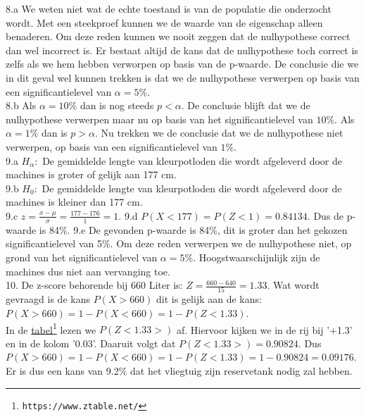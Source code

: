 8.a We weten niet wat de echte toestand is van de populatie die onderzocht wordt. Met een steekproef kunnen we de waarde van de eigenschap alleen benaderen. Om deze reden kunnen we nooit zeggen dat de nulhypothese correct dan wel incorrect is. Er bestaat altijd de kans dat de nulhypothese toch correct is zelfs als we hem hebben verworpen op basis van de p-waarde. De conclusie die we in dit geval wel kunnen trekken is dat we de nulhypothese verwerpen op basis van een significantielevel van $\alpha=5\%$.\\
8.b Als $\alpha=10\%$ dan is nog steeds $p<\alpha$. De conclusie blijft dat we de nulhypothese verwerpen maar nu op basis van het significantielevel van $10\%$. Als $\alpha=1\%$ dan is $p>\alpha$. Nu trekken we de conclusie dat we de nulhypothese niet verwerpen, op basis van een significantielevel van $1\%$.\\


9.a $H_{\alpha}:$ De gemiddelde lengte van kleurpotloden die wordt afgeleverd door de machines is groter of gelijk aan 177 cm.\\
9.b $H_{0}:$ De gemiddelde lengte van kleurpotloden die wordt afgeleverd door de machines is kleiner dan 177 cm.\\
9.c $z=\frac{x-\mu}{\sigma} = \frac{177-176}{1} = 1$.
9.d $P(X< 177) = P(Z< 1) = 0.84134$. Dus de p-waarde is 84\%.
9.e De gevonden p-waarde is 84\%, dit is groter dan het gekozen significantielevel van 5\%. Om deze reden verwerpen we de nulhypothese niet, op grond van het significantielevel van $\alpha=5\%$. Hoogstwaarschijnlijk zijn de machines dus niet aan vervanging toe.\\


10. De z-score behorende bij 660 Liter is: $Z=\frac{660-640}{15} = 1.33$. Wat wordt gevraagd is de kans $P(X>660)$ dit is gelijk aan de kans:
$P(X>660)= 1-P(X< 660) = 1-P(Z<1.33)$.\\
In de \href{https://www.ztable.net/}{\color{blue}tabel}\footnote{\texttt{https://www.ztable.net/}} lezen we $P(Z<1.33>)$ af. Hiervoor kijken we in de rij bij '+1.3' en in de kolom '0.03'. Daaruit volgt dat
$P(Z<1.33>) = 0.90824$. Dus 
$P(X>660) = 1-P(X< 660) = 1-P(Z<1.33) = 1-0.90824 = 0.09176$.\\
Er is dus een kans van 9.2\% dat het vliegtuig zijn reservetank nodig zal hebben.







